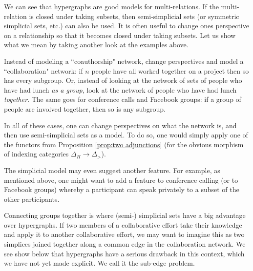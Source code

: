 \documentclass{amsart}
\begin{document}
We can see that hypergraphs are good models for multi-relations.  If the multi-relation is closed under taking subsets, then semi-simplicial sets (or symmetric simplicial sets, etc.) can also be used.  It is often useful to change ones perspective on a relationship so that it becomes closed under taking subsets.  Let us show what we mean by taking another look at the examples above.

Instead of modeling a ``coauthorship" network, change perspectives and model a ``collaboration" network: if $n$ people have all worked together on a project then so has every subgroup.  Or, instead of looking at the network of sets of people who have had lunch {\em as a group}, look at the network of people who have had lunch {\em together}.  The same goes for conference calls and Facebook groups: if a group of people are involved together, then so is any subgroup.  

In all of these cases, one can change perspectives on what the network is, and then use semi-simplicial sets as a model.  To do so, one would simply apply one of the functors from Proposition \ref{prop:two adjunctions} (for the obvious morphism of indexing categories $\Delta_H\to\Delta_>$).

The simplicial model may even suggest another feature.  For example, as mentioned above, one might want to add a feature to conference calling (or to Facebook groups) whereby a participant can speak privately to a subset of the other participants.

Connecting groups together is where (semi-) simplicial sets have a big advantage over hypergraphs.  If two members of a collaborative effort take their knowledge and apply it to another collaborative effort, we may want to imagine this as two simplices joined together along a common edge in the collaboration network.  We see show below that hypergraphs have a serious drawback in this context, which we have not yet made explicit.  We call it the sub-edge problem.  
\end{document}
